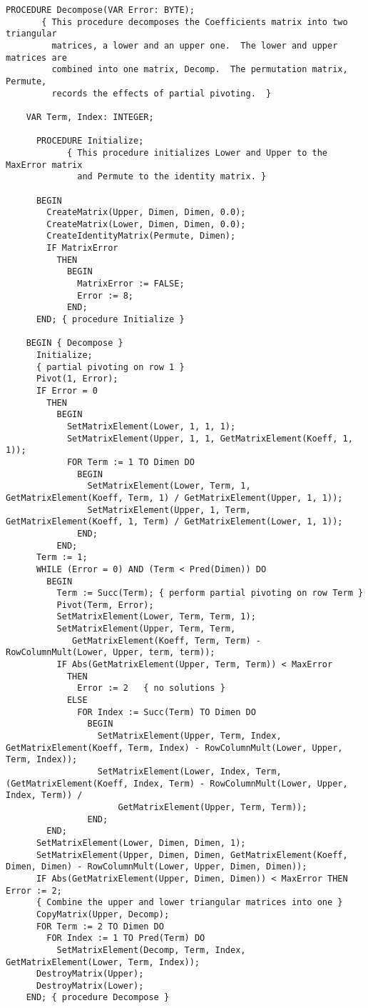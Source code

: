 \begin{lstlisting}[caption=LU-decomposition]
    PROCEDURE Decompose(VAR Error: BYTE);
       { This procedure decomposes the Coefficients matrix into two triangular
         matrices, a lower and an upper one.  The lower and upper matrices are
         combined into one matrix, Decomp.  The permutation matrix, Permute,
         records the effects of partial pivoting.  }

    VAR Term, Index: INTEGER;

      PROCEDURE Initialize;
            { This procedure initializes Lower and Upper to the MaxError matrix
              and Permute to the identity matrix. }

      BEGIN
        CreateMatrix(Upper, Dimen, Dimen, 0.0);
        CreateMatrix(Lower, Dimen, Dimen, 0.0);
        CreateIdentityMatrix(Permute, Dimen);
        IF MatrixError
          THEN
            BEGIN
              MatrixError := FALSE;
              Error := 8;
            END;
      END; { procedure Initialize }

    BEGIN { Decompose }
      Initialize;
      { partial pivoting on row 1 }
      Pivot(1, Error);
      IF Error = 0
        THEN
          BEGIN
            SetMatrixElement(Lower, 1, 1, 1);
            SetMatrixElement(Upper, 1, 1, GetMatrixElement(Koeff, 1, 1));
            FOR Term := 1 TO Dimen DO
              BEGIN
                SetMatrixElement(Lower, Term, 1, GetMatrixElement(Koeff, Term, 1) / GetMatrixElement(Upper, 1, 1));
                SetMatrixElement(Upper, 1, Term, GetMatrixElement(Koeff, 1, Term) / GetMatrixElement(Lower, 1, 1));
              END;
          END;
      Term := 1;
      WHILE (Error = 0) AND (Term < Pred(Dimen)) DO
        BEGIN
          Term := Succ(Term); { perform partial pivoting on row Term }
          Pivot(Term, Error);
          SetMatrixElement(Lower, Term, Term, 1);
          SetMatrixElement(Upper, Term, Term,
             GetMatrixElement(Koeff, Term, Term) - RowColumnMult(Lower, Upper, term, term));
          IF Abs(GetMatrixElement(Upper, Term, Term)) < MaxError
            THEN
              Error := 2   { no solutions }
            ELSE
              FOR Index := Succ(Term) TO Dimen DO
                BEGIN
                  SetMatrixElement(Upper, Term, Index, GetMatrixElement(Koeff, Term, Index) - RowColumnMult(Lower, Upper, Term, Index));
                  SetMatrixElement(Lower, Index, Term, (GetMatrixElement(Koeff, Index, Term) - RowColumnMult(Lower, Upper, Index, Term)) /
                      GetMatrixElement(Upper, Term, Term));
                END;
        END;
      SetMatrixElement(Lower, Dimen, Dimen, 1);
      SetMatrixElement(Upper, Dimen, Dimen, GetMatrixElement(Koeff, Dimen, Dimen) - RowColumnMult(Lower, Upper, Dimen, Dimen));
      IF Abs(GetMatrixElement(Upper, Dimen, Dimen)) < MaxError THEN Error := 2;
      { Combine the upper and lower triangular matrices into one }
      CopyMatrix(Upper, Decomp);
      FOR Term := 2 TO Dimen DO
        FOR Index := 1 TO Pred(Term) DO
          SetMatrixElement(Decomp, Term, Index, GetMatrixElement(Lower, Term, Index));
      DestroyMatrix(Upper);
      DestroyMatrix(Lower);
    END; { procedure Decompose }


\end{lstlisting}
